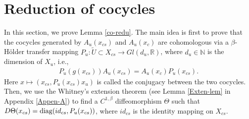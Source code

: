 \documentclass[reqno]{amsart}
\numberwithin{equation}{section}
\begin{document}
\section{Reduction of cocycles}\label{Sec-6}

In this section, we prove Lemma \ref{co-redu}. The main idea is first to prove that the cocycles generated by $A_u(x_{cs})$ and $A_u(x_c)$ are cohomologous via a $\beta$-H\"older transfer mapping $P_u:\tilde U\subset X_{cs}\to Gl(d_u,\mathbb{R})$, where $d_u\in\mathbb{N}$ is the dimension of $X_u$, i.e.,
\begin{align}\label{Cohm-eqn}
P_u(g(x_{cs}))A_u(x_{cs})=A_u(x_{c})P_u(x_{cs}).
\end{align}
Here $x \mapsto (x_{cs}, P_u(x_{cs})x_u)$ is called the conjugacy between the two cocycles.
Then, we use the Whitney's extension theorem (see Lemma \ref{Exten-lem} in Appendix \ref{Appen-A}) to find a $C^{1,\beta}$ diffeomorphism $\Theta$ such that $D\Theta(x_{cs})={\rm diag}(id_{cs},P_u(x_{cs}))$, where $id_{cs}$ is the identity mapping on $X_{cs}$.
\end{document}
